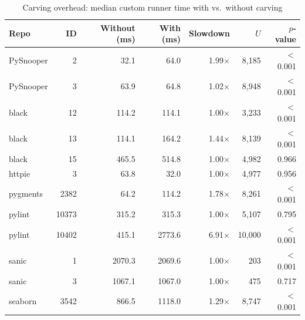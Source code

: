 \begin{table}[htbp]
    \centering
    \caption{Carving overhead: median custom runner time with vs.\ without carving}
    \label{tab:carving_overhead}
    \small
    \renewcommand{\arraystretch}{1.2}
    \begin{tabularx}{\linewidth}{@{} >{\raggedright\arraybackslash}X r r r r r r @{}}
        \toprule
        \textbf{Repo} & \textbf{ID} & \textbf{Without (ms)} & \textbf{With (ms)} & \textbf{Slowdown} & \textbf{$U$} & \textbf{$p$-value} \\
        \midrule
        PySnooper     & 2           & 32.1                  & 64.0               & 1.99$\times$      & 8,185        & $<$0.001           \\
        PySnooper     & 3           & 63.9                  & 64.8               & 1.02$\times$      & 8,948        & $<$0.001           \\
        black         & 12          & 114.2                 & 114.1              & 1.00$\times$      & 3,233        & $<$0.001           \\
        black         & 13          & 114.1                 & 164.2              & 1.44$\times$      & 8,139        & $<$0.001           \\
        black         & 15          & 465.5                 & 514.8              & 1.00$\times$      & 4,982        & 0.966              \\
        httpie        & 3           & 63.8                  & 32.0               & 1.00$\times$      & 4,977        & 0.956              \\
        pygments      & 2382        & 64.2                  & 114.2              & 1.78$\times$      & 8,261        & $<$0.001           \\
        pylint        & 10373       & 315.2                 & 315.3              & 1.00$\times$      & 5,107        & 0.795              \\
        pylint        & 10402       & 415.1                 & 2773.6             & 6.91$\times$      & 10,000       & $<$0.001           \\
        sanic         & 1           & 2070.3                & 2069.6             & 1.00$\times$      & 203          & $<$0.001           \\
        sanic         & 3           & 1067.1                & 1067.0             & 1.00$\times$      & 475          & 0.717              \\
        seaborn       & 3542        & 866.5                 & 1118.0             & 1.29$\times$      & 8,747        & $<$0.001           \\

\end{tabularx}
\end{table}

